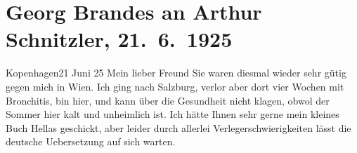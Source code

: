

         
         \renewcommand{\erwaehntePersonen}{Personen:  ?? [Kusine von Gertrud Rung], Georg Brandes, Gertrud Rung, Otto Rung}
         \renewcommand{\erwaehnteInstitutionen}{Institutionen: Akademie der Wissenschaften, Burgtheater}
         \renewcommand{\erwaehnteOrte}{Orte: Burgtheater, Italien, Kopenhagen, Moskau, Russland, Salzburg, Sankt Petersburg, Wien}
         \renewcommand{\erwaehnteWerke}{Werke: Der Schleier der Beatrice. Schauspiel in fünf Akten, Hellas}
               \section[Georg Brandes an Arthur Schnitzler, 21. 6. 1925]{ Georg Brandes an Arthur Schnitzler, 21. 6. 1925}\nopagebreak{}\rehead{ }\begin{ledgroupsized}[t]{13cm}\normalsize\beginnumbering{} \toendnotes[C]{\smallbreak\pagebreak[2]} 
\toendnotes[C]{\smallbreak}\pstart
           \raggedleft{}{\pb}Kopenhagen21 Juni 25\pend
           \pstart{}Mein lieber Freund\pend\pstart
           Sie waren diesmal wieder sehr gütig gegen mich in Wien. Ich ging nach Salzburg, verlor aber
               dort vier Wochen mit Bronchitis, bin hier, und kann über die Gesundheit nicht klagen,
               obwol der Sommer hier kalt und unheimlich ist.\pend
           \pstart
           Ich hätte Ihnen sehr gerne mein kleines Buch Hellas geschickt, aber leider durch allerlei Verlegerschwierigkeiten lässt
               die deutsche Uebersetzung auf sich warten.\pend

\end{ledgroupsized}
